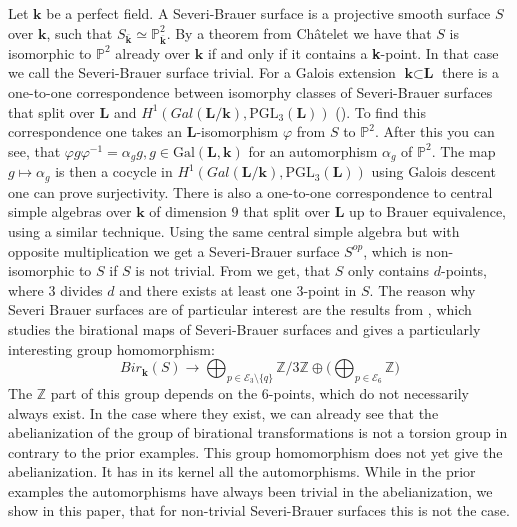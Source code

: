 \documentclass[12pt, oneside, reqno]{amsart}
\begin{document}
\newline Let $\textbf{k}$ be a perfect field. A Severi-Brauer surface is a projective smooth surface $S$ over $\textbf{k}$, such that $S_{\bar{\textbf{k}}} \simeq \mathbb{P}^2_{\bar{\textbf{k}}}$. By a theorem from Châtelet we have that $S$ is isomorphic to $\mathbb{P}^2$ already over $\textbf{k}$ if and only if it contains a \textbf{k}-point. In that case we call the Severi-Brauer surface trivial. For a Galois extension $\textbf{k} \subset \textbf{L}$ there is a one-to-one correspondence between isomorphy classes of Severi-Brauer surfaces that split over $\textbf{L}$ and $H^1(Gal(\textbf{L}/ \textbf{k}), \textrm{PGL}_3(\textbf{L}))$ (\cite{serre2004corps}). To find this correspondence one takes an $\textbf{L}$-isomorphism $\varphi$ from $S$ to $\mathbb{P}^2$. After this you can see, that $\varphi g \varphi^{-1} = \alpha_g g, g \in \textrm{Gal}(\textbf{L},\textbf{k})$ for an automorphism $\alpha_g$ of $\mathbb{P}^2$. The map $g \mapsto \alpha_g$ is then a cocycle in $H^1(Gal(\textbf{L}/ \textbf{k}), \textrm{PGL}_3(\textbf{L}))$ using Galois descent one can prove surjectivity. There is also a one-to-one correspondence to central simple algebras over $\textbf{k}$ of dimension $9$ that split over $\textbf{L}$ up to Brauer equivalence, using a similar technique. Using the same central simple algebra but with opposite multiplication we get a Severi-Brauer surface $S^{op}$, which is non-isomorphic to $S$ if $S$ is not trivial. From \cite{kollár2016} we get, that $S$ only contains $d$-points, where $3$ divides $d$ and there exists at least one $3$-point in $S$. The reason why Severi Brauer surfaces are of particular interest are the results from \cite{BSY}, which studies the birational maps of Severi-Brauer surfaces and gives a particularly interesting group homomorphism:
\[Bir_{\textbf{k}}(S) \rightarrow \bigoplus_{p \in \mathcal{E}_3 \setminus \{ q \}} \mathbb{Z}/3\mathbb{Z} \oplus \big (\bigoplus_{p \in \mathcal{E}_6} \mathbb{Z} \big )\]
The $\mathbb{Z}$ part of this group depends on the $6$-points, which do not necessarily always exist. In the case where they exist, we can already see that the abelianization of the group of birational transformations is not a torsion group in contrary to the prior examples. This group homomorphism does not yet give the abelianization. It has in its kernel all the automorphisms. While in the prior examples the automorphisms have always been trivial in the abelianization, we show in this paper, that for non-trivial Severi-Brauer surfaces this is not the case.
\newline 
\end{document}
